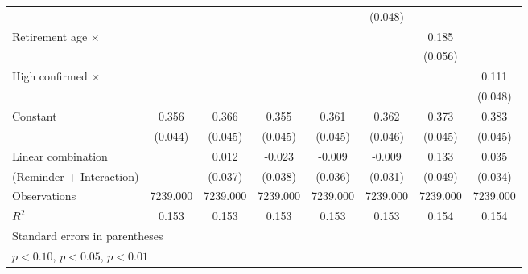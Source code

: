 {\begin{tabular}{l*{7}{c}}
                    &                     &                     &                     &                     &     (0.048)         &                     &                     \\
\addlinespace
Retirement age $\times$&                     &                     &                     &                     &                     &       0.185\sym{***}&                     \\
                    &                     &                     &                     &                     &                     &     (0.056)         &                     \\
\addlinespace
High confirmed $\times$&                     &                     &                     &                     &                     &                     &       0.111\sym{**} \\
                    &                     &                     &                     &                     &                     &                     &     (0.048)         \\
\addlinespace
Constant            &       0.356\sym{***}&       0.366\sym{***}&       0.355\sym{***}&       0.361\sym{***}&       0.362\sym{***}&       0.373\sym{***}&       0.383\sym{***}\\
                    &     (0.044)         &     (0.045)         &     (0.045)         &     (0.045)         &     (0.046)         &     (0.045)         &     (0.045)         \\
\midrule
Linear combination  &                     &       0.012         &      -0.023         &      -0.009         &      -0.009         &       0.133         &       0.035         \\
(Reminder + Interaction)&                     &     (0.037)         &     (0.038)         &     (0.036)         &     (0.031)         &     (0.049)         &     (0.034)         \\
Observations        &    7239.000         &    7239.000         &    7239.000         &    7239.000         &    7239.000         &    7239.000         &    7239.000         \\
\(R^{2}\)           &       0.153         &       0.153         &       0.153         &       0.153         &       0.153         &       0.154         &       0.154         \\
\bottomrule
\multicolumn{8}{l}{\footnotesize Standard errors in parentheses}\\
\multicolumn{8}{l}{\footnotesize \sym{*} \(p<0.10\), \sym{**} \(p<0.05\), \sym{***} \(p<0.01\)}\\
\end{tabular}
}
